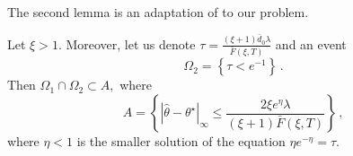 \documentclass[twoside,11pt]{article}
\def\th{\theta}
\def\ths{\th^\star}
\def\hth{\hat{\theta}}
\def\bd0{\bar{d} _0}
\def\bef{\bar{F}(\xi,T)}
\begin{document}
The second lemma is an adaptation of \citet[Theorem 3.1]{Cox13} to our problem.

\begin{lemma}
\label{estim}
Let $\xi >1 .$  Moreover,
let us denote $\tau = \frac{(\xi +1) \bd0 \lambda }{ \bef }$ and an event
\begin{equation}
\label{omega2}
\Omega_2=\left\{\tau < e^{-1} \right\}\,.
\end{equation}
Then $\Omega_1 \cap \Omega_2 \subset A,$ where
\begin{equation}
\label{estim1}
A= \left\{|\hth - \ths| _\infty \leq \frac{2 \xi e^\eta \lambda}{(\xi+1) \bef } \right\}\,, 
\end{equation}
where $\eta < 1 $ is the smaller solution of the equation $\eta e ^{- \eta} = \tau.$
\end{lemma}
\end{document}

